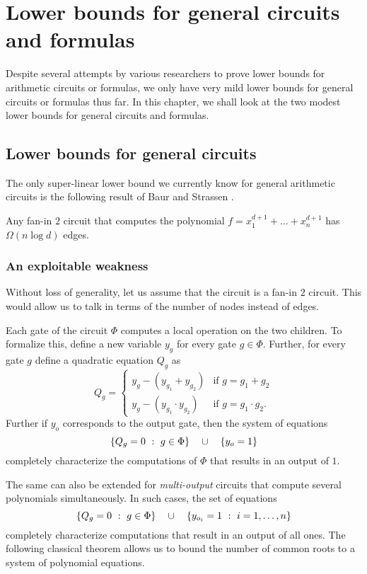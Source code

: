 \chapter{Lower bounds for general circuits and formulas}\label{chap:gen-ckt-formulas}

Despite several attempts by various researchers to prove lower bounds for arithmetic circuits or formulas, we only have very mild lower bounds for general circuits or formulas thus far. 
In this chapter, we shall look at the two  modest lower bounds for general circuits and formulas. 

\section{Lower bounds for general circuits}\label{sec:baur-strassen}

The only super-linear lower bound we currently know for general arithmetic circuits is the following  result of Baur and Strassen \cite{BS83}.

\begin{theorem}[\cite{BS83}]\label{thm:baur-strassen}
  Any fan-in $2$ circuit that computes the polynomial $f = x_1^{d+1} + \dots + x_n^{d+1}$ has $\Omega(n\log d)$ edges. 
\end{theorem}


\subsection{An exploitable weakness}

Without loss of generality, let us assume that the circuit is a fan-in $2$ circuit. 
This would allow us to talk in terms of the number of nodes instead of edges. 

Each gate of the circuit $\Phi$ computes a local operation on the two children. 
To formalize this, define a new variable $y_g$ for every gate $g \in \Phi$. 
Further, for every gate $g$ define a quadratic equation $Q_g$ as
$$
Q_g = \begin{cases} y_g - (y_{g_1} + y_{g_2}) & \text{if $g = g_1 + g_2$}\\
  y_g - (y_{g_1}\cdot y_{g_2}) & \text{if $g = g_1 \cdot g_2$}.
\end{cases}
$$
Further if $y_o$  corresponds to the output gate, then the system of equations
$$\left\{{Q_g = 0}\ : \ {g\in \Phi}\right\} \quad \cup \quad \left\{y_{o} = 1\right\}$$
completely characterize the computations of $\Phi$ that results in an output of $1$. 

The same can also be extended for \emph{multi-output} circuits that compute several polynomials simultaneously. 
In such cases, the set of equations
$$\left\{{Q_g = 0}\ : \ {g\in \Phi}\right\} \quad \cup \quad \left\{{y_{o_i} = 1}\ : \ {i=1, \ldots, n}\right\}$$
completely characterize computations that result in an output of all ones. 
The following classical theorem allows us to bound the number of  common roots to a system of polynomial equations. 

